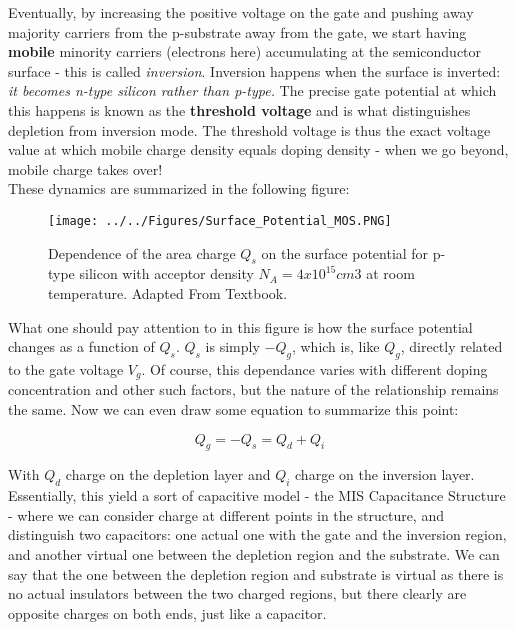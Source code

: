 Eventually, by increasing the positive voltage on the gate and pushing away majority carriers from the p-substrate away from the gate, we start having \textbf{mobile} minority carriers (electrons here) accumulating at the semiconductor surface - this is called \textit{inversion}. Inversion happens when the surface is inverted: \textit{it becomes n-type silicon rather than p-type.} The precise gate potential at which this happens is known as the \textbf{threshold voltage} and is what distinguishes depletion from inversion mode. The threshold voltage is thus the exact voltage value at which mobile charge density equals doping density - when we go beyond, mobile charge takes over! \\

These dynamics are summarized in the following figure: 

\begin{figure}[H]
    \centering
    \texttt{[image: ../../Figures/Surface\_Potential\_MOS.PNG]}
    \caption{Dependence of the area charge $Q_s$ on the surface potential for p-type silicon with acceptor density $N_A = 4 x10^{15} cm3$ at room temperature. Adapted From Textbook.}
    \label{fig:Surface_Potential_MOS}
\end{figure}

What one should pay attention to in this figure is how the surface potential changes as a function of $Q_s$. $Q_s$ is simply $-Q_g$, which is, like $Q_g$, directly related to the gate voltage $V_g$. Of course, this dependance varies with different doping concentration and other such factors, but the nature of the relationship remains the same. Now we can even draw some equation to summarize this point: 

\begin{equation}
    Q_g = - Q_s = Q_d + Q_i
\end{equation}

With $Q_d$ charge on the depletion layer and $Q_i$ charge on the inversion layer. Essentially, this yield a sort of capacitive model - the MIS Capacitance Structure - where we can consider charge at different points in the structure, and distinguish two capacitors: one actual one with the gate and the inversion region, and another virtual one between the depletion region and the substrate. We can say that the one between the depletion region and substrate is virtual as there is no actual insulators between the two charged regions, but there clearly are opposite charges on both ends, just like a capacitor. 

